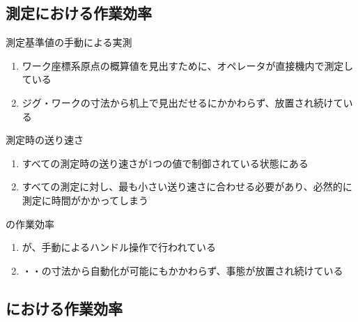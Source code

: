 \subsection{測定における作業効率}

\begin{Issues}{測定基準値の手動による実測}
\begin{enumerate}[label=\sarrow]
\item[{\sarrow[red]}]ワーク座標系原点の概算値を見出すために、オペレータが直接機内で測定している
\item[{\sarrow[red]}]ジグ・ワークの寸法から机上で見出だせるにかかわらず、放置され続けている
\end{enumerate}
\end{Issues}

\begin{Issues}{測定時の送り速さ}
\begin{enumerate}[label=\sarrow]
\item[{\sarrow[red]}]すべての測定時の送り速さが1つの値で制御されている状態にある
\item[{\sarrow[red]}]すべての測定に対し、最も小さい送り速さに合わせる必要があり、必然的に測定に時間がかかってしまう
\end{enumerate}
\end{Issues}

\begin{Issues}{\CenterlineEndFaceDifMeasurement の作業効率}
\begin{enumerate}[label=\sarrow]
\item[{\sarrow[red]}]\CenterlineEndFaceDifMeasurement が、手動によるハンドル操作で行われている
\item[{\sarrow[red]}]\Outcut・\Keyway・\CenterCurvature の寸法から自動化が可能にもかかわらず、事態が放置され続けている
\end{enumerate}
\end{Issues}


\clearpage
\subsection{\EndFacecutMilling における作業効率}

